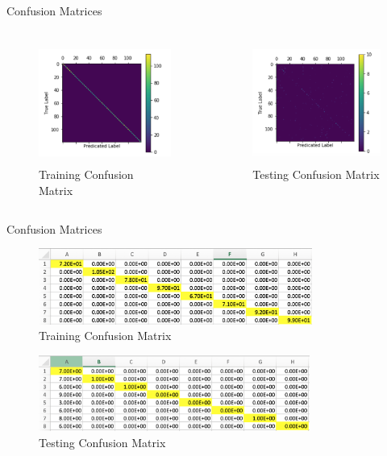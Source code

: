 \documentclass[leqno]{beamer}
\begin{document}
\begin{frame}{Confusion Matrices}
    \begin{columns}
        \begin{column}{0.45\textwidth}
            \begin{figure}
                \includegraphics[height=4cm]{train_matrix.jpg}
                \caption{Training Confusion Matrix}
            \end{figure}
        \end{column}
        \begin{column}{0.45\textwidth}
            \begin{figure}
                \includegraphics[height=4cm]{test_matrix.jpg}
                \caption{Testing Confusion Matrix}
            \end{figure}
        \end{column}
    \end{columns}
\end{frame}

\begin{frame}{Confusion Matrices}
    \begin{figure}
        \includegraphics[height=2.5cm]{trainCM.jpg}
        \caption{Training Confusion Matrix}
    \end{figure}
    \begin{figure}
        \includegraphics[height=2.5cm]{testCM.jpg}
        \caption{Testing Confusion Matrix}
    \end{figure}
\end{frame}
\end{document}
